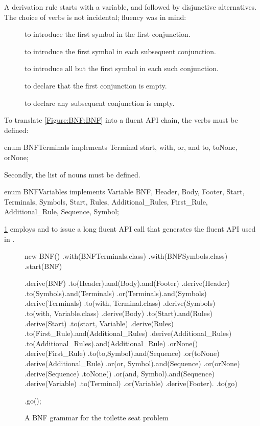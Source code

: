 A derivation rule starts with a variable, and followed by disjunctive alternatives.
The choice of verbs is not incidental; fluency was in mind:
\begin{description}
  \item[] to introduce the first symbol in the first conjunction.
  \item[] to introduce the first symbol in each subsequent conjunction.
  \item[] to introduce all but the first symbol in each such conjunction.
  \item[] to declare that the first conjunction is empty.
  \item[] to declare any subsequent conjunction is empty.
\end{description}

To translate \cref{Figure:BNF:BNF} into a fluent 
  API chain, the verbs must be defined:
  \begin{JAVA}
enum BNFTerminals implements Terminal {
  start, with, or, and
  to, toNone, orNone;
}
\end{JAVA}

Secondly, the list of nouns must be defined.
\begin{JAVA}
enum BNFVariables implements Variable {
  BNF, Header, Body, Footer,
  Start, Terminals, Symbols,
  Start, Rules, Additional_Rules,
  First_Rule, Additional_Rule,
  Sequence, Symbol;
}
\end{JAVA}

\cref{Figure:BNF:fluent} employs   and 
    to issue a long fluent API
  call that generates the fluent API used in \SELF. 

\begin{figure}[htbp]
  \begin{JAVA}[style=numbered]
new BNF()
  .with(BNFTerminals.class)       
  .with(BNFSymbols.class)
  .start(BNF)

  .derive(BNF)
    .to(Header).and(Body).and(Footer)
  .derive(Header)
    .to(Symbols).and(Terminals)           
    .or(Terminals).and(Symbols)
  .derive(Terminals)
    .to(with, Terminal.class)
  .derive(Symbols)
    .to(with, Variable.class)
  .derive(Body)
    .to(Start).and(Rules)
  .derive(Start)
    .to(start, Variable)
  .derive(Rules)
    .to(First_Rule).and(Additional_Rules)    
  .derive(Additional_Rules)
    .to(Additional_Rules).and(Additional_Rule)    
    .orNone() 
  .derive(First_Rule)
    .to(to,Symbol).and(Sequence)
    .or(toNone)
  .derive(Additional_Rule)
    .or(or, Symbol).and(Sequence)
    .or(orNone)
  .derive(Sequence)
    .toNone()
    .or(and, Symbol).and(Sequence)
  .derive(Variable)
    .to(Terminal)
    .or(Variable)
  .derive(Footer).
     .to(go)

.go();
  \end{JAVA}
  \caption{A BNF grammar for the toilette seat problem}
  \label{Figure:BNF:fluent}
\end{figure}
